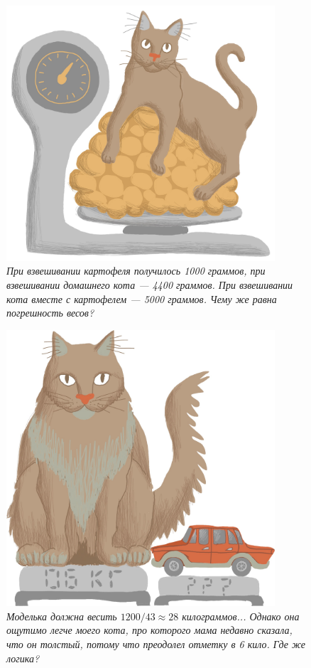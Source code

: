 \documentclass[10pt]{scrbook} \usepackage{modules/nonstahp_book}
\begin{document}
\begin{figure} \begin{center}
	\includegraphics[width=10cm]{figures/color/02c.jpg}
	\vspace{1cm}
	\caption{
             {\itshape  При взвешивании картофеля получилось 1000 граммов, при 
             взвешивании домашнего кота — 4400 граммов. При взвешивании кота вместе 
             с картофелем --- 5000 граммов. Чему же равна погрешность весов? }\medskip\\
             }
\end{center} \end{figure}

\begin{figure} \begin{center}
	\includegraphics[width=10cm]{figures/color/03c.jpg}
	\vspace{1cm}
	\caption{
             {\itshape  Моделька должна весить $1200 / 43 \approx 28$ килограммов... 
             Однако она ощутимо легче моего кота, про которого мама недавно сказала, 
             что он толстый, потому что преодолел отметку в 6 кило. Где же логика? }\medskip\\
             }
\end{center} \end{figure}
\end{document}
